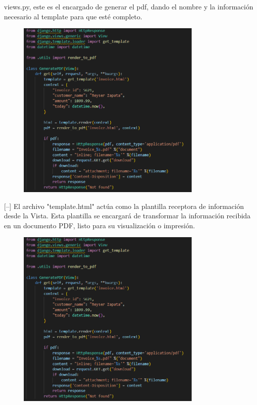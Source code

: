 \documentclass{article}
\begin{document}
\begin{enumerate}
\begin{description}
[--] views.py, este es el encargado de generar el pdf, dando el nombre y la información necesario al template para que esté completo.
\begin{figure}[H]
		\centering
		\includegraphics[width=0.8\textwidth,keepaspectratio]{img/Ejercicio3/2.png}
	\end{figure}
[--] El archivo "template.html" actúa como la plantilla receptora de información desde la Vista. Esta plantilla se encargará de transformar la información recibida en un documento PDF, listo para su visualización o impresión.
\begin{figure}[H]
		\centering
		\includegraphics[width=0.8\textwidth,keepaspectratio]{img/Ejercicio3/2.png}

\end{figure}
\end{description}
\end{enumerate}
\end{document}
